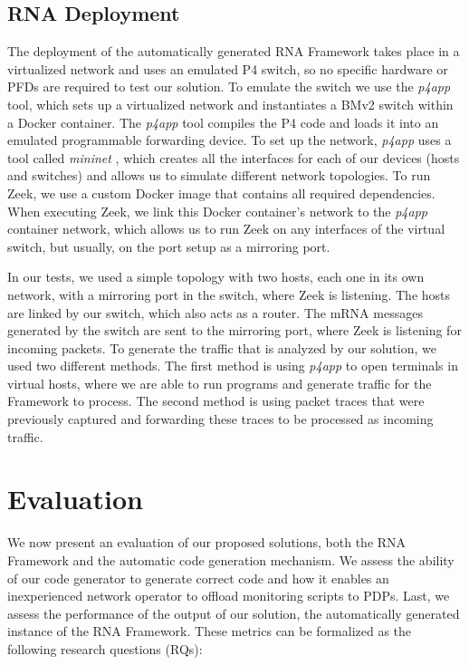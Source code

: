 \subsection{RNA Deployment}
\label{sec:evaluation:deployment}

The deployment of the automatically generated RNA Framework takes place in a virtualized network and uses an emulated P4 switch, so no specific hardware or PFDs are required to test our solution. To emulate the switch we use the \textit{p4app} tool, which sets up a virtualized network and instantiates a BMv2 switch \cite{BMv2} within a Docker container. The \textit{p4app} tool \cite{P4App} compiles the P4 code and loads it into an emulated programmable forwarding device. To set up the network, \textit{p4app} uses a tool called \textit{mininet} \cite{Mininet}, which creates all the interfaces for each of our devices (hosts and switches) and allows us to simulate different network topologies. To run Zeek, we use a custom Docker image that contains all required dependencies. When executing Zeek, we link this Docker container's network to the \textit{p4app} container network, which allows us to run Zeek on any interfaces of the virtual switch, but usually, on the port setup as a mirroring port.

In our tests, we used a simple topology with two hosts, each one in its own network, with a mirroring port in the switch, where Zeek is listening. The hosts are linked by our switch, which also acts as a router. The mRNA messages generated by the switch are sent to the mirroring port, where Zeek is listening for incoming packets. To generate the traffic that is analyzed by our solution, we used two different methods. The first method is using \textit{p4app} to open terminals in virtual hosts, where we are able to run programs and generate traffic for the Framework to process. The second method is using packet traces that were previously captured and forwarding these traces to be processed as incoming traffic.


\section{Evaluation}
\label{sec:evaluation:evaluation}

We now present an evaluation of our proposed solutions, both the RNA Framework and the automatic code generation mechanism. We assess the ability of our code generator to generate correct code and how it enables an inexperienced network operator to offload monitoring scripts to PDPs. Last, we assess the performance of the output of our solution, the automatically generated instance of the RNA Framework. These metrics can be formalized as the following research questions (RQs):

